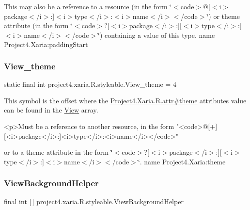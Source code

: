 This may also be a reference to a resource (in the form \char`\"{}$<$code$>$@\mbox{[}$<$i$>$package$<$/i$>$\+:\mbox{]}$<$i$>$type$<$/i$>$\+:$<$i$>$name$<$/i$>$$<$/code$>$\char`\"{}) or theme attribute (in the form \char`\"{}$<$code$>$?\mbox{[}$<$i$>$package$<$/i$>$\+:\mbox{]}\mbox{[}$<$i$>$type$<$/i$>$\+:\mbox{]}$<$i$>$name$<$/i$>$$<$/code$>$\char`\"{}) containing a value of this type.  name Project4.\+Xaria\+:padding\+Start \mbox{\label{classproject4_1_1xaria_1_1R_1_1styleable_a1d278e0c69dd3ae9a0e88dac09d952c1}} 
\subsubsection{\texorpdfstring{View\+\_\+theme}{View\_theme}}
{\footnotesize\ttfamily static final int project4.\+xaria.\+R.\+styleable.\+View\+\_\+theme = 4\hspace{0.3cm}{\ttfamily [static]}}

This symbol is the offset where the \hyperlink{}{Project4.\+Xaria.\+R.\+attr\#theme} attribute\textquotesingle{}s value can be found in the \hyperlink{classproject4_1_1xaria_1_1R_1_1styleable_a26a934fb1a597b7811923bdd4d3d8ecf}{View} array.

\begin{DoxyVerb}      <p>Must be a reference to another resource, in the form "<code>@[+][<i>package</i>:]<i>type</i>:<i>name</i></code>"
\end{DoxyVerb}
 or to a theme attribute in the form \char`\"{}$<$code$>$?\mbox{[}$<$i$>$package$<$/i$>$\+:\mbox{]}\mbox{[}$<$i$>$type$<$/i$>$\+:\mbox{]}$<$i$>$name$<$/i$>$$<$/code$>$\char`\"{}.  name Project4.\+Xaria\+:theme \mbox{\label{classproject4_1_1xaria_1_1R_1_1styleable_aba3e0fe0ba2d99dd8aaedee442947fbe}} 
\subsubsection{\texorpdfstring{View\+Background\+Helper}{ViewBackgroundHelper}}
{\footnotesize\ttfamily final int \mbox{[}$\,$\mbox{]} project4.\+xaria.\+R.\+styleable.\+View\+Background\+Helper\hspace{0.3cm}{\ttfamily [static]}}

